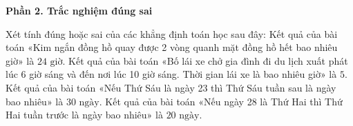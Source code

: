 \textbf{Phần 2. Trắc nghiệm đúng sai}

\begin{ex} %
Xét tính đúng hoặc sai của các khẳng định toán học sau đây:
\choiceTF
{\True Kết quả của bài toán «Kim ngắn đồng hồ quay được 2 vòng quanh mặt đồng hồ hết bao nhiêu giờ» là $24\text{ giờ}$.}
{Kết quả của bài toán «Bố lái xe chở gia đình đi du lịch xuất phát lúc 6 giờ sáng và đến nơi lúc 10 giờ sáng. Thời gian lái xe là bao nhiêu giờ» là $5$.}
{\True Kết quả của bài toán «Nếu Thứ Sáu là ngày 23 thì Thứ Sáu tuần sau là ngày bao nhiêu» là $30\text{ ngày}$.}
{Kết quả của bài toán «Nếu ngày 28 là Thứ Hai thì Thứ Hai tuần trước là ngày bao nhiêu» là $20\text{ ngày}$.}
\end{ex}


